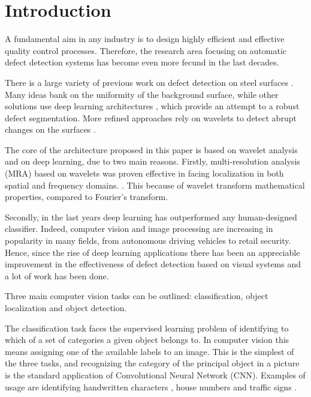\section{Introduction}
    \par{
        A fundamental aim in any industry is to design highly efficient and effective quality control processes. Therefore, the research area focusing on automatic defect detection systems has become even more fecund in the last decades. 
    }
    \par{
        There is a large variety of previous work on defect detection on steel surfaces \cite{ieee:4777721, ieee:7030439, ieee:8623728, ieee:1334512, ieee:6738559}. Many ideas \cite{ieee:4777721, ieee:7030439, ieee:8623728} bank on the uniformity of the background surface, while other solutions use deep learning architectures \cite{ieee:1334512, ieee:6738559}, which provide an attempt to a robust defect segmentation. More refined approaches rely on wavelets to detect abrupt changes on the surfaces \cite{ieee:993164, ieee:6703333, ieee:7155940, sciencedirect:NGAN2011442}. 
    }
    \par{
        The core of the architecture proposed in this paper is based on wavelet analysis and on deep learning, due to two main reasons. Firstly, multi-resolution analysis (MRA) based on wavelets was proven effective in facing localization in both spatial and frequency domains. \cite{Vetterli:1995:WSC:201007, Daubechies:1992:TLW:130655, intechopen:bernardini}. This because of wavelet transform mathematical properties, compared to Fourier's transform.
    }
    \par{
        Secondly, in the last years deep learning \cite{Goodfellow:2016:DL:3086952, Rojas:1996:NNS:235222} has outperformed any human-designed classifier. Indeed, computer vision and image processing are increasing in popularity in many fields, from autonomous driving vehicles to retail security. Hence, since the rise of deep learning applications \cite{researchgate:deeplearning} there has been an appreciable improvement in the effectiveness of defect detection based on visual systems and a lot of work has been done.
    }
    \par{
        Three main computer vision tasks can be outlined: classification, object localization and object detection.
    }
    \par{
        The classification task faces the supervised learning problem of identifying to which of a set of categories a given object belongs to. In computer vision this means assigning one of the available labels to an image. This is the simplest of the three tasks, and recognizing the category of the principal object in a picture is the standard application of Convolutional Neural Network (CNN). Examples of usage are identifying handwritten characters \cite{nips:NIPS1989_293, ieee:6248110}, house numbers \cite{ieee:6460867} and traffic signs \cite{ieee:6248110}.

    }
